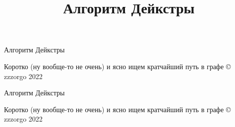 \documentclass[9pt, letterpaper, twocolumn]{article}
\title{Алгоритм Дейкстры}
\date{\vspace{-5ex}}
\begin{document}
\begin{titlepage}
    \pagecolor{accentColor}
    \vspace*{5cm}
    {\titlefont \textcolor{backgroundColor}{Алгоритм Дейкстры}}
    \vspace{0.5cm}

    \textcolor{backgroundColor}{\Large Коротко  (ну вообще-то не очень) и ясно ищем кратчайший путь в графе}
    \vfill
    \textcolor{backgroundColor}{{\large © zzzorgo 2022}}
    \clearpage

    \pagecolor{backgroundColor}
    \vspace*{5cm}
    {\titlefont Алгоритм Дейкстры}
    \vspace{0.5cm}

    \Large Коротко  (ну вообще-то не очень) и ясно ищем кратчайший путь в графе
    \vfill
    {\large © zzzorgo 2022}

    \clearpage
    \pagecolor{backgroundColor}
    \vspace*{\fill}
    \tableofcontents
    \vspace*{\fill}
    \restoregeometry
    \clearpage
\end{titlepage}






\end{document}
